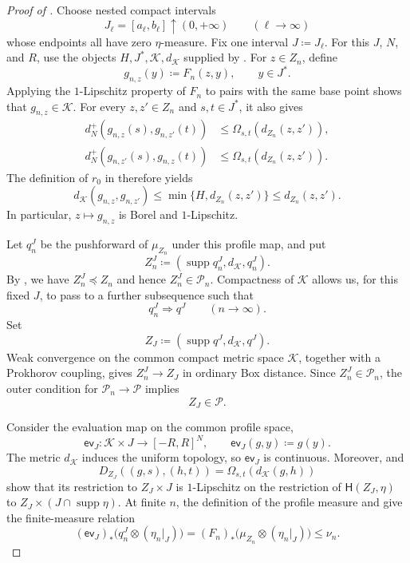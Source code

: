 \documentclass[10pt,a4paper]{amsart}
\numberwithin{equation}{section}
\DeclareMathOperator{\supp}{supp}
\begin{document}
\begin{proof}[Proof of ]
Choose nested compact intervals
\[
 J_\ell=[a_\ell,b_\ell]\uparrow(0,+\infty)
 \qquad(\ell\to\infty)
\]
whose endpoints all have zero $\eta$-measure.  Fix one interval $J\coloneqq J_\ell$.  For this $J$, $N$, and $R$,
use the objects $H,J^*,\mathscr K,d_{\mathscr K}$ supplied by .  For $z\in Z_n$,
define
\[
 g_{n,z}(y)\coloneqq F_n(z,y),
 \qquad y\in J^*.
\]
Applying the $1$-Lipschitz property of $F_n$ to pairs with the same base point shows that
$g_{n,z}\in\mathscr K$.  For every $z,z'\in Z_n$ and $s,t\in J^*$, it also gives
\[
 \begin{aligned}
 d_N^+(g_{n,z}(s),g_{n,z'}(t))
 &\le\Omega_{s,t}(d_{Z_n}(z,z')),\\
 d_N^+(g_{n,z'}(s),g_{n,z}(t))
 &\le\Omega_{s,t}(d_{Z_n}(z,z')).
 \end{aligned}
\]
The definition of $r_0$ in  therefore yields
\begin{equation}\label{eq:joint-profile-factor-map}
 d_{\mathscr K}(g_{n,z},g_{n,z'})
 \le\min\{H,d_{Z_n}(z,z')\}
 \le d_{Z_n}(z,z').
\end{equation}
In particular, $z\mapsto g_{n,z}$ is Borel and $1$-Lipschitz.

Let $q_n^J$ be the pushforward of $\mu_{Z_n}$ under this profile map, and put
\[
 Z_n^J\coloneqq(\supp q_n^J,d_{\mathscr K},q_n^J).
\]
By , we have $Z_n^J\preceq Z_n$ and hence $Z_n^J\in\mathcal P_n$.  Compactness
of $\mathscr K$ allows us, for this fixed $J$, to pass to a further subsequence such that
\[
 q_n^J\Rightarrow q^J
 \qquad(n\to\infty).
\]
Set
\[
 Z_J\coloneqq(\supp q^J,d_{\mathscr K},q^J).
\]
Weak convergence on the common compact metric space $\mathscr K$, together with a Prokhorov coupling, gives
$Z_n^J\to Z_J$ in ordinary Box distance.  Since $Z_n^J\in\mathcal P_n$, the outer condition for
$\mathcal P_n\to\mathcal P$ implies
\begin{equation}\label{eq:joint-profile-limit-base}
 Z_J\in\mathcal P.
\end{equation}

Consider the evaluation map on the common profile space,
\[
 \mathsf{ev}_J\colon\mathscr K\times J\longrightarrow[-R,R]^N,
 \qquad \mathsf{ev}_J(g,y)\coloneqq g(y).
\]
The metric $d_{\mathscr K}$ induces the uniform topology, so $\mathsf{ev}_J$ is continuous.  Moreover,
 and
\[
 D_{Z_J}((g,s),(h,t))=\Omega_{s,t}(d_{\mathscr K}(g,h))
\]
show that its restriction to $Z_J\times J$ is $1$-Lipschitz on the restriction of $\mathsf H(Z_J,\eta)$ to
$Z_J\times(J\cap\supp\eta)$.  At finite $n$, the definition of the profile measure and
 give the finite-measure relation
\begin{equation}\label{eq:joint-profile-submeasure-finite}
 (\mathsf{ev}_J)_*\bigl(q_n^J\otimes(\eta_n|_J)\bigr)
 =(F_n)_*\bigl(\mu_{Z_n}\otimes(\eta_n|_J)\bigr)
 \le\nu_n.
\end{equation}


\end{proof}
\end{document}
